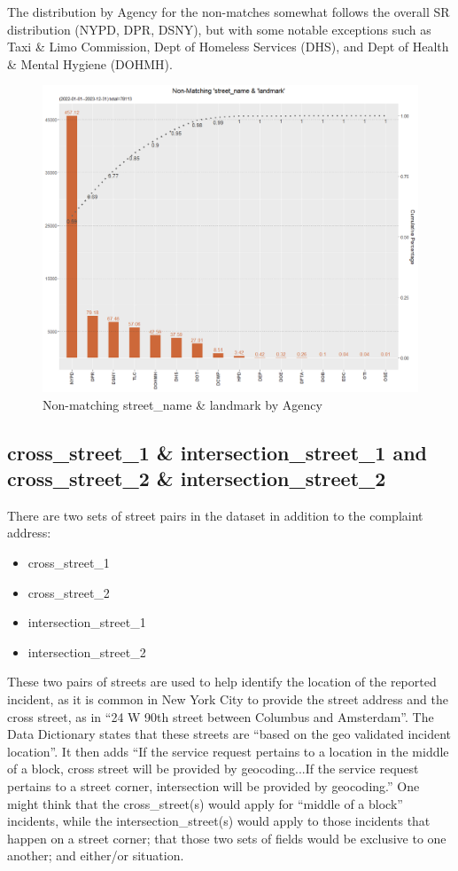 \documentclass[12pt, titlepage]{article}
\begin{document}
{The distribution by Agency for the non-matches somewhat follows the overall SR distribution (NYPD, DPR, DSNY), 
but with some notable exceptions such as Taxi \& Limo Commission, Dept of Homeless Services (DHS),
 and Dept of Health \& Mental Hygiene (DOHMH).

\begin{figure}[H]
		 \centering
		 \includegraphics[width = \textwidth]{landmark_dup.png}
		 \caption{Non-matching street\_name \& landmark by Agency }
		 \label{fig:landmarkchart}
	\end{figure}	
	
	
\subsection{cross\_street\_1 \& intersection\_street\_1 and cross\_street\_2 \& intersection\_street\_2}
There are two sets of street pairs in the dataset in addition to the complaint address:

	\begin{itemize}
		\item cross\_street\_1
		\item cross\_street\_2
		\item intersection\_street\_1
		\item intersection\_street\_2
	\end{itemize}
	
These two pairs of streets are used to help identify the location of the reported incident, as it is common in
New York City to provide the street address and the cross street, as in ``24 W 90th street between Columbus and
Amsterdam''. The Data Dictionary states that these streets are
 ``based on the geo validated incident location''. It then adds ``If the service request 
pertains to a location in the middle of a block, cross street will be provided by geocoding...If the service request 
pertains to a street corner, intersection will be provided by geocoding.''  One might think that the
cross\_street(s) would apply for ``middle of a block'' incidents, while the intersection\_street(s) would
apply to those incidents that happen on a street corner; that those two sets of fields would be
exclusive to one another; and either/or situation. 

}
\end{document}
